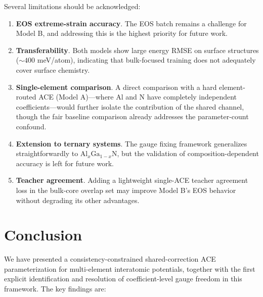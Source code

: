 \documentclass[twoside,prb,aps,floatfix,superscriptaddress,longbibliography]{revtex4-2}
\begin{document}
Several limitations should be acknowledged:
\begin{enumerate}
    \item \textbf{EOS extreme-strain accuracy}. The EOS batch remains a challenge for Model B, and addressing this is the highest priority for future work.
    \item \textbf{Transferability}. Both models show large energy RMSE on surface structures ($\sim 400$ meV/atom), indicating that bulk-focused training does not adequately cover surface chemistry.
    \item \textbf{Single-element comparison}. A direct comparison with a hard element-routed ACE (Model A)---where Al and N have completely independent coefficients---would further isolate the contribution of the shared channel, though the fair baseline comparison already addresses the parameter-count confound.
    \item \textbf{Extension to ternary systems}. The gauge fixing framework generalizes straightforwardly to $\mathrm{Al}_x\mathrm{Ga}_{1-x}\mathrm{N}$, but the validation of composition-dependent accuracy is left for future work.
    \item \textbf{Teacher agreement}. Adding a lightweight single-ACE teacher agreement loss in the bulk-core overlap set may improve Model B's EOS behavior without degrading its other advantages.
\end{enumerate}

\section{Conclusion}
\label{sec:conclusion}

We have presented a consistency-constrained shared-correction ACE parameterization for multi-element interatomic potentials, together with the first explicit identification and resolution of coefficient-level gauge freedom in this framework. The key findings are:
\end{document}
